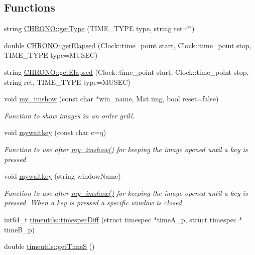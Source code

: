 \subsection*{Functions}
\begin{DoxyCompactItemize}
\item 
string \mbox{\hyperlink{namespace_c_h_r_o_n_o_ae2a3e41f8bf5f83ba84d3f4d2eed3836}{C\+H\+R\+O\+N\+O\+::get\+Type}} (T\+I\+M\+E\+\_\+\+T\+Y\+PE type, string ret=\char`\"{}\char`\"{})
\item 
double \mbox{\hyperlink{namespace_c_h_r_o_n_o_aebe2329c142a6f06b6fede41c3abf1b3}{C\+H\+R\+O\+N\+O\+::get\+Elapsed}} (Clock\+::time\+\_\+point start, Clock\+::time\+\_\+point stop, T\+I\+M\+E\+\_\+\+T\+Y\+PE type=M\+U\+S\+EC)
\item 
string \mbox{\hyperlink{namespace_c_h_r_o_n_o_ad8da7180c420d59f4c0077b60579c0ae}{C\+H\+R\+O\+N\+O\+::get\+Elapsed}} (Clock\+::time\+\_\+point start, Clock\+::time\+\_\+point stop, string ret, T\+I\+M\+E\+\_\+\+T\+Y\+PE type=M\+U\+S\+EC)
\item 
void \mbox{\hyperlink{utils_8hh_aabfea83501dfccfa4c420b8c19ceefd7}{my\+\_\+imshow}} (const char $\ast$win\+\_\+name, Mat img, bool reset=false)
\begin{DoxyCompactList}\small\item\em Function to show images in an order grill. \end{DoxyCompactList}\item 
void \mbox{\hyperlink{utils_8hh_af046ae860c3e4985ab0968caffb4c772}{mywaitkey}} (const char c=\textquotesingle{}q\textquotesingle{})
\begin{DoxyCompactList}\small\item\em Function to use after \mbox{\hyperlink{utils_8hh_aabfea83501dfccfa4c420b8c19ceefd7}{my\+\_\+imshow()}} for keeping the image opened until a key is pressed. \end{DoxyCompactList}\item 
void \mbox{\hyperlink{utils_8hh_a31ae190fba03c3a422a13a4271e0e424}{mywaitkey}} (string window\+Name)
\begin{DoxyCompactList}\small\item\em Function to use after \mbox{\hyperlink{utils_8hh_aabfea83501dfccfa4c420b8c19ceefd7}{my\+\_\+imshow()}} for keeping the image opened until a key is pressed. When a key is pressed a specific window is closed. \end{DoxyCompactList}\item 
int64\+\_\+t \mbox{\hyperlink{namespacetimeutils_a3d9d509a7028cffae8aef9c70f6c2c52}{timeutils\+::timespec\+Diff}} (struct timespec $\ast$time\+A\+\_\+p, struct timespec $\ast$time\+B\+\_\+p)
\item 
double \mbox{\hyperlink{namespacetimeutils_aa732b7f41462ff727daef77bd5030b9c}{timeutils\+::get\+TimeS}} ()
\end{DoxyCompactItemize}


